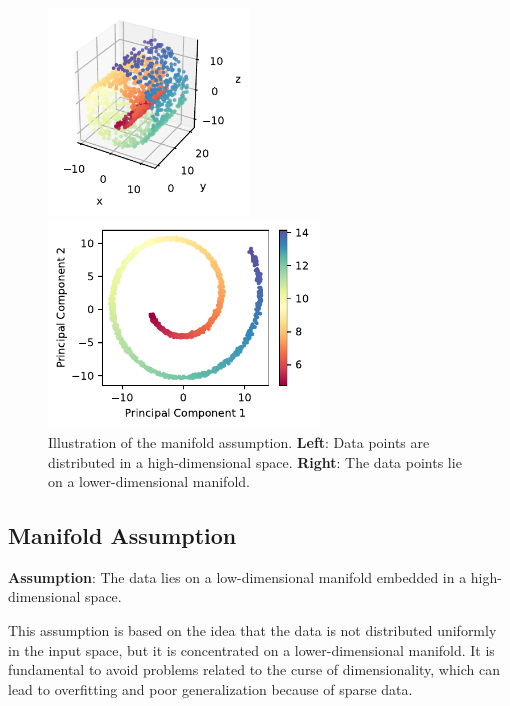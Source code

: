 \begin{figure}[h]
    \centering
    \begin{minipage}{0.4\textwidth}
        \centering
        \includegraphics[height=5.5cm]{images/ssl/swiss_roll_3d.pdf} %
    \end{minipage}\hfill
    \begin{minipage}{0.55\textwidth}
        \centering
        \includegraphics[height=5.5cm]{images/ssl/swiss_roll_pca.pdf} %
    \end{minipage}
    \caption[Illustration of the manifold assumption.]
    {Illustration of the manifold assumption. 
        \textbf{Left}: Data points are distributed in a high-dimensional space. 
        \textbf{Right}: The data points lie on a lower-dimensional manifold.}
    \label{fig:swiss_roll}
\end{figure}

\subsection{Manifold Assumption}
\textbf{Assumption}: The data lies on a low-dimensional manifold embedded in a 
high-dimensional space.

This assumption is based on the idea that the data is not distributed uniformly 
in the input space, but it is concentrated on a lower-dimensional manifold.
It is fundamental to avoid problems related to the curse of dimensionality, 
which can lead to overfitting and poor generalization because of sparse data.

